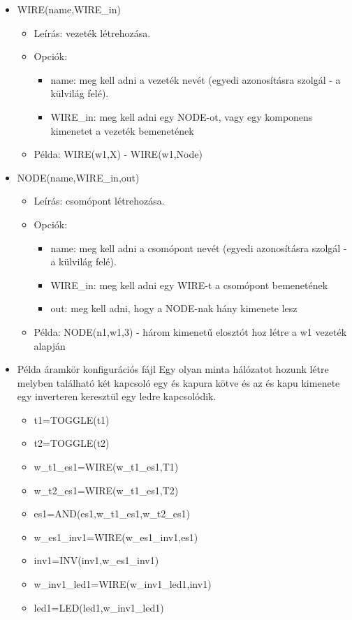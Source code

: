 \begin{itemize}
\item WIRE(name,WIRE\_in)
	\begin{itemize}
	\item Leírás: vezeték létrehozása.
	\item Opciók: 
		\begin{itemize}
			\item name: meg kell adni a vezeték nevét (egyedi azonosításra szolgál - a külvilág felé).
			\item WIRE\_in: meg kell adni egy NODE-ot, vagy egy komponens kimenetet a vezeték bemenetének 
		\end{itemize}
	\item Példa: WIRE(w1,X) - WIRE(w1,Node)
	\end{itemize}	

\item NODE(name,WIRE\_in,out)
	\begin{itemize}
	\item Leírás: csomópont létrehozása.
	\item Opciók: 
		\begin{itemize}
			\item name: meg kell adni a csomópont nevét (egyedi azonosításra szolgál - a külvilág felé).
			\item WIRE\_in: meg kell adni egy WIRE-t a csomópont bemenetének 
			\item out: meg kell adni, hogy a NODE-nak hány kimenete lesz
		\end{itemize}
	\item Példa: NODE(n1,w1,3) - három kimenetű elosztót hoz létre a w1 vezeték alapján
	\end{itemize}
	
\item Példa áramkör konfigurációs fájl
Egy olyan minta hálózatot hozunk létre melyben található két kapcsoló egy és kapura kötve és az és kapu kimenete egy inverteren keresztül egy ledre kapcsolódik.
	\begin{itemize}
	\item t1=TOGGLE(t1)
	\item t2=TOGGLE(t2)
	\item w\_t1\_es1=WIRE(w\_t1\_es1,T1)
	\item w\_t2\_es1=WIRE(w\_t1\_es1,T2)
	\item es1=AND(es1,w\_t1\_es1,w\_t2\_es1)	
	\item w\_es1\_inv1=WIRE(w\_es1\_inv1,es1)	
	\item inv1=INV(inv1,w\_es1\_inv1)
	\item w\_inv1\_led1=WIRE(w\_inv1\_led1,inv1)
	\item led1=LED(led1,w\_inv1\_led1)
	\end{itemize}	


\end{itemize}

